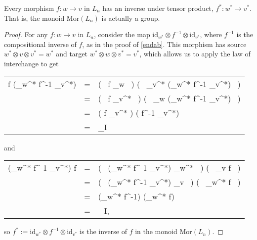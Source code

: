 \documentclass{amsbook} %
\numberwithin{section}{chapter}
\begin{document}
\begin{prop} \label{tensinv} Every morphism $f: w \to v$ in $L_n$ has an inverse under tensor product, $f^*: w^* \to v^*$. That is, the monoid $\mathrm{Mor}(L_n)$ is actually a group.
\end{prop}
\begin{proof}
For any $f: w \to v$ in $L_n$, consider the map $\mathrm{id}_{w^*} \otimes f^{-1} \otimes \mathrm{id}_{v^*}$, where $f^{-1}$ is the compositional inverse of $f$, as in the proof of \cref{endab}. This morphism has source $w^* \otimes v \otimes v^* = w^*$ and target $w^* \otimes w \otimes v^* = v^*$, which allows us to apply the law of interchange to get
\begin{longtable}{RLL}
			f \otimes (_{w^*} \otimes f^{-1} \otimes {}_{v^*}) & = & \big( \, f \circ {}_w \, \big) \otimes \big( \, _{v^*} \circ  (_{w^*} \otimes f^{-1} \otimes {}_{v^*}) \, \big) \\
			& = & \big( \, f \otimes {}_{v^*} \, \big) \circ \big( \, _w \otimes (_{w^*} \otimes f^{-1} \otimes {}_{v^*}) \, \big) \\
			& = & ( f \otimes {}_{v^*} ) \circ ( f^{-1} \otimes {}_{v^*}) \\
			& = & _I
\end{longtable}
and 
\begin{longtable}{RLL}
			(_{w^*} \otimes f^{-1} \otimes {}_{v^*}) \otimes f & = & \big( \, (_{w^*} \otimes f^{-1} \otimes {}_{v^*}) \circ {}_{w^*} \, \big) \otimes \big( \, _v \circ f \, \big) \\
			& = & \big( \, (_{w^*} \otimes f^{-1} \otimes {}_{v^*}) \otimes {}_v \, \big) \circ \big( \, _{w^*} \otimes f \, \big) \\
			& = & (_{w^*} \otimes f^{-1}) \circ (_{w^*} \otimes f) \\
			& = & _I,
\end{longtable}
so $f^* := \mathrm{id}_{w^*} \otimes f^{-1} \otimes \mathrm{id}_{v^*}$ is the inverse of $f$ in the monoid $\mathrm{Mor}(L_n)$.
\end{proof}
\end{document}
